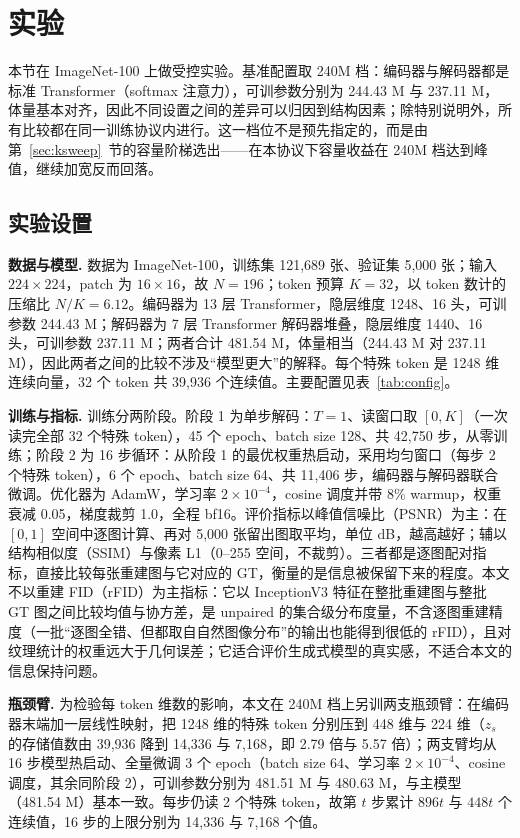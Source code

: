 \section{\heiti 实验}
\label{sec:experiments}

本节在 ImageNet-100 上做受控实验。基准配置取 240M 档：编码器与解码器都是标准 Transformer（softmax 注意力），可训参数分别为 244.43 M 与 237.11 M，体量基本对齐，因此不同设置之间的差异可以归因到结构因素；除特别说明外，所有比较都在同一训练协议内进行。这一档位不是预先指定的，而是由第~\ref{sec:ksweep}~节的容量阶梯选出——在本协议下容量收益在 240M 档达到峰值，继续加宽反而回落。

\subsection{\heiti 实验设置}
\label{sec:impl}

\textbf{数据与模型.} 数据为 ImageNet-100，训练集 121,689 张、验证集 5,000 张；输入 $224\times224$，patch 为 $16\times16$，故 $N=196$；token 预算 $K=32$，以 token 数计的压缩比 $N/K=6.12$。编码器为 13 层 Transformer，隐层维度 1248、16 头，可训参数 244.43 M；解码器为 7 层 Transformer 解码器堆叠，隐层维度 1440、16 头，可训参数 237.11 M；两者合计 481.54 M，体量相当（244.43 M 对 237.11 M），因此两者之间的比较不涉及“模型更大”的解释。每个特殊 token 是 1248 维连续向量，32 个 token 共 39{,}936 个连续值。主要配置见表~\ref{tab:config}。

\textbf{训练与指标.} 训练分两阶段。阶段 1 为单步解码：$T=1$、读窗口取 $[0,K]$（一次读完全部 32 个特殊 token），45 个 epoch、batch size 128、共 42{,}750 步，从零训练；阶段 2 为 16 步循环：从阶段 1 的最优权重热启动，采用均匀窗口（每步 2 个特殊 token），6 个 epoch、batch size 64、共 11{,}406 步，编码器与解码器联合微调。优化器为 AdamW，学习率 $2\times10^{-4}$，cosine 调度并带 8\% warmup，权重衰减 0.05，梯度裁剪 1.0，全程 bf16。评价指标以峰值信噪比（PSNR）为主：在 $[0,1]$ 空间中逐图计算、再对 5,000 张留出图取平均，单位 dB，越高越好；辅以结构相似度（SSIM）与像素 L1（0--255 空间，不裁剪）。三者都是逐图配对指标，直接比较每张重建图与它对应的 GT，衡量的是信息被保留下来的程度。本文不以重建 FID（rFID）为主指标：它以 InceptionV3 特征在整批重建图与整批 GT 图之间比较均值与协方差，是 unpaired 的集合级分布度量，不含逐图重建精度（一批“逐图全错、但都取自自然图像分布”的输出也能得到很低的 rFID），且对纹理统计的权重远大于几何误差；它适合评价生成式模型的真实感，不适合本文的信息保持问题。

\textbf{瓶颈臂.} 为检验每 token 维数的影响，本文在 240M 档上另训两支瓶颈臂：在编码器末端加一层线性映射，把 1248 维的特殊 token 分别压到 448 维与 224 维（$z_s$ 的存储值数由 39,936 降到 14,336 与 7,168，即 2.79 倍与 5.57 倍）；两支臂均从 16 步模型热启动、全量微调 3 个 epoch（batch size 64、学习率 $2\times10^{-4}$、cosine 调度，其余同阶段 2），可训参数分别为 481.51 M 与 480.63 M，与主模型（481.54 M）基本一致。每步仍读 2 个特殊 token，故第 $t$ 步累计 $896t$ 与 $448t$ 个连续值，16 步的上限分别为 14{,}336 与 7{,}168 个值。

